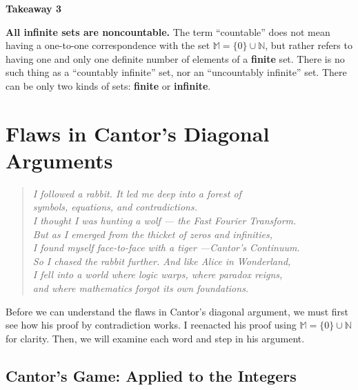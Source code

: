 \documentclass[12pt]{article}
\theoremstyle{definition} %
\numberwithin{equation}{section}
\newcommand{\tkatarget}[2]{%
  \noindent\phantomsection%
  \hypertarget{#1}{{\large\textbf{\textcolor{red!70!black}{Takeaway #2}}}}%
}
\begin{document}
\vspace{1em}
\noindent \tkatarget{tka_3}{3} 
\textbf{All infinite sets are noncountable.}  
The term “countable” does not mean having a one-to-one correspondence with the set \(\mathbb{M} = \{0\} \cup \mathbb{N}\), but rather refers to having one and only one definite number of elements of a \textbf{finite} set.  
There is no such thing as a “countably infinite” set, nor an “uncountably infinite” set.  
There can be only two kinds of sets: \textbf{finite} or \textbf{infinite}.

\newpage
\section{Flaws in Cantor's Diagonal Arguments}

\begin{quote}
\textit{
I followed a rabbit. It led me deep into a forest of\\
symbols, equations, and contradictions.\\
I thought I was hunting a wolf — the Fast Fourier Transform.\\
But as I emerged from the thicket of zeros and infinities,\\
I found myself face-to-face with a tiger —Cantor’s Continuum.\\[1.5ex]
So I chased the rabbit further. And like Alice in Wonderland,\\
I fell into a world where logic warps, where paradox reigns,\\
and where mathematics forgot its own foundations. }
\end{quote}

Before we can understand the flaws in Cantor's diagonal argument, we must first see how his proof by contradiction works. I reenacted his proof using \( \mathbb{M} = \{0\} \cup \mathbb{N} \) for clarity. Then, we will examine each word and step in his argument.

\subsection{Cantor's Game: Applied to the Integers}
\label{sec:Cantor-Game-Applied-to-the-integers}
\end{document}
